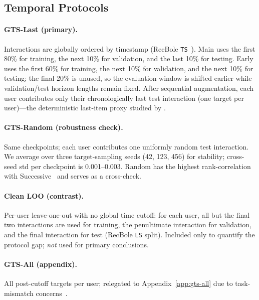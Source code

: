 \documentclass[sigconf,natbib=true,anonymous]{acmart}
\begin{document}
\subsection{Temporal Protocols}
\label{sec:protocol}

\paragraph{GTS-Last (primary).}
Interactions are globally ordered by timestamp (RecBole \texttt{TS}~\cite{zhao2021recbole}).
Main uses the first 80\% for training, the next 10\% for validation, and the last 10\% for testing.
Early uses the first 60\% for training, the next 10\% for validation, and the next 10\% for testing; the final 20\% is unused, so the evaluation window is shifted earlier while validation/test horizon lengths remain fixed.
After sequential augmentation, each user contributes only their chronologically last test interaction (one target per user)---the deterministic last-item proxy studied by \citet{gusak2025time}.

\paragraph{GTS-Random (robustness check).}
Same checkpoints; each user contributes one uniformly random test interaction.  We average over three target-sampling seeds (42, 123, 456) for stability; cross-seed std per checkpoint is 0.001--0.003.
Random has the highest rank-correlation with Successive~\cite{gusak2025time} and serves as a cross-check.

\paragraph{Clean LOO (contrast).}
Per-user leave-one-out with no global time cutoff: for each user, all but the final two interactions are used for training, the penultimate interaction for validation, and the final interaction for test (RecBole \texttt{LS} split).
Included only to quantify the protocol gap; \emph{not} used for primary conclusions.

\paragraph{GTS-All (appendix).}
All post-cutoff targets per user; relegated to Appendix~\ref{app:gts-all} due to task-mismatch concerns~\cite{gusak2025time}.
\end{document}
